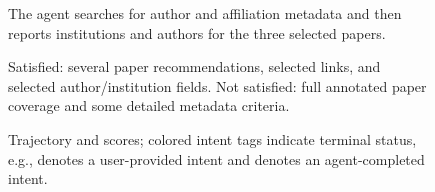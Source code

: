 \begin{figure}[h]
{    
    The agent searches for author and affiliation metadata and then reports institutions and authors for the three selected papers.

    \vspace{5pt}
    \hspace{3pt}

    \vspace{3pt}
    \noindent{}
    Satisfied: several paper recommendations, selected links, and selected author/institution fields.
    Not satisfied: full annotated paper coverage and some detailed metadata criteria.
    }
    \caption{Trajectory and scores; colored intent tags indicate terminal status, e.g.,  denotes a user-provided intent and  denotes an agent-completed intent.}
    \label{fig:case_zhanghaoran_1_hidden_intent_resolution}
\end{figure}
